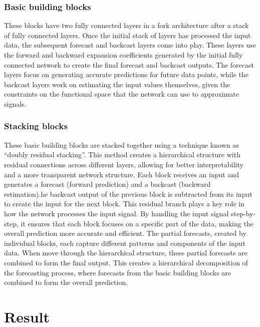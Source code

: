 \documentclass{ieeeojies}
\begin{document}
\subsubsection{Basic building blocks}
These blocks have two fully connected layers in a fork architecture after a stack of fully connected layers. Once the initial stack of layers has processed the input data, the subsequent forecast and backcast layers come into play. These layers use the forward and backward expansion coefficients generated by the initial fully connected network to create the final forecast and backcast outputs.
\newline The forecast layers focus on generating accurate predictions for future data points, while the backcast layers work on estimating the input values themselves, given the constraints on the functional space that the network can use to approximate signals.
\subsubsection{Stacking blocks}
These basic building blocks are stacked together using a technique known as “doubly residual stacking”. This method creates a hierarchical structure with residual connections across different layers, allowing for better interpretability and a more transparent network structure. Each block receives an input and generates a forecast (forward prediction) and a backcast (backward estimation).he backcast output of the previous block is subtracted from its input to create the input for the next block. This residual branch plays a key role in how the network processes the input signal. By handling the input signal step-by-step, it ensures that each block focuses on a specific part of the data, making the overall prediction more accurate and efficient.
The partial forecasts, created by individual blocks, each capture different patterns and components of the input data. When move through the hierarchical structure, these partial forecasts are combined to form the final output. This creates a hierarchical decomposition of the forecasting process, where forecasts from the basic building blocks are combined to form the overall prediction.
\section{Result}
\end{document}
